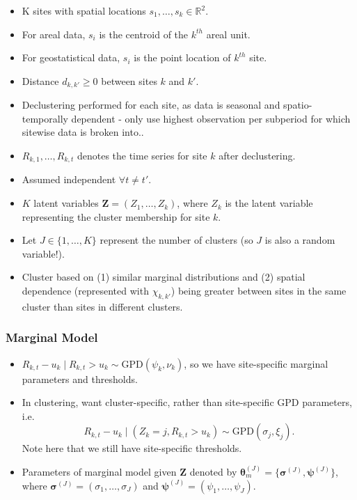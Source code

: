 \documentclass{article}
\begin{document}
\begin{itemize}
\begin{itemize}
  \item K sites with spatial locations $s_1, \ldots, s_k \in \mathbb{R}^2$.
  \item For areal data, $s_i$ is the centroid of the $k^{th}$ areal unit. 
  \item For geostatistical data, $s_i$ is the point location of $k^{th}$ site. 
  \item Distance $d_{k, k'} \ge 0$ between sites $k$ and $k'$.
  \item Declustering performed for each site, as data is seasonal and spatio-temporally dependent - only use highest observation per subperiod for which sitewise data is broken into..
  \item $R_{k, 1}, \ldots, R_{k, t}$ denotes the time series for site $k$ after declustering. 
  \item Assumed independent $\forall t \ne t'$. 
  \item $K$ latent variables $\bm{Z} = (Z_1, \ldots, Z_k)$, where $Z_k$ is the latent variable representing the cluster membership for site $k$.
  \item Let $J \in \{1, \ldots, K\}$ represent the number of clusters (so $J$ is also a random variable!).
  \item Cluster based on (1) similar marginal distributions and (2) spatial dependence (represented with $\chi_{k, k'}$) being greater between sites in the same cluster than sites in different clusters. 
\end{itemize}

\subsubsection{Marginal Model}

\begin{itemize}
  \item $R_{k, t} - u_k \mid R_{k, t} > u_k \sim \text{GPD}(\psi_k, \nu_k)$, so we have site-specific marginal parameters and thresholds. 
  \item In clustering, want cluster-specific, rather than site-specific GPD parameters, i.e.\ 
  \[
    R_{k, t} - u_k \mid (Z_k = j, R_{k, t} > u_k) \sim \text{GPD}(\sigma_j, \xi_j).
  \]
  Note here that we still have site-specific thresholds. 
\item Parameters of marginal model given $\bm{Z}$ denoted by $\bm{\theta}_m^{(J)} = \{\bm{\sigma}^{(J)}, \bm{\psi}^{(J)}\}$, where $\bm{\sigma}^{(J)} = (\sigma_1, \ldots, \sigma_J)$ and $\bm{\psi}^{(J)} = (\psi_1, \ldots, \psi_J)$. 
\end{itemize}


\end{itemize}
\end{document}
